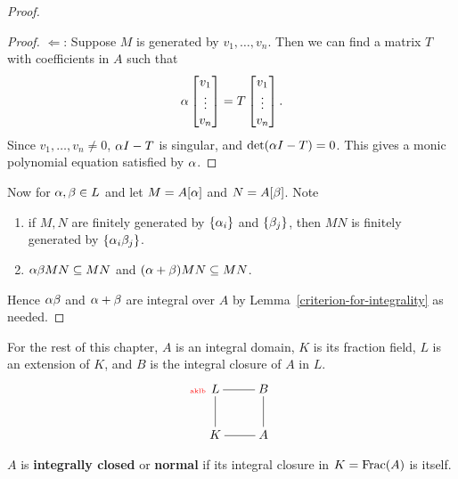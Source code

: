 \begin{proof}
\begin{proof}
$\Leftarrow$: Suppose $M$ is generated by $v_1,\ldots, v_n$. Then we can find a matrix $T$ with coefficients in $A$ such that
\[\alpha \begin{bmatrix}v_1\\ \vdots \\ v_n\end{bmatrix}=
T\begin{bmatrix}v_1\\ \vdots \\ v_n\end{bmatrix}.\]
Since $v_1,\ldots, v_n\neq 0$, $\alpha I-T$ is singular, and $\det(\alpha I-T)=0$. This gives a monic polynomial equation satisfied by $\alpha$.
\end{proof}
Now for $\alpha, \beta\in L$ and let $M=A[\alpha]$ and $N=A[\beta]$. 
Note
\begin{enumerate}
\item
if $M,N$ are finitely generated by $\{\alpha_i\}$ and $\{\beta_j\}$, then
$MN$ is finitely generated by $\{\alpha_i\beta_j\}$.
\item 
$\alpha\beta MN\subseteq MN$ and $(\alpha+\beta)MN\subseteq MN$.
\end{enumerate}
Hence $\alpha\beta$ and $\alpha+\beta$ are integral over $A$ by Lemma~\ref{criterion-for-integrality} as needed.
\end{proof}
For the rest of this chapter, $A$ is an integral domain, $K$ is its fraction field, $L$ is an extension of $K$, and $B$ is the integral closure of $A$ in $L$. %
\begin{equation}\llabel{aklb}
\xymatrix{
L\ar@{-}[r]\ar@{-}[d]&B\ar@{-}[d]\\
K\ar@{-}[r]&A
}
\end{equation}
\begin{df}
$A$ is \textbf{integrally closed} or \textbf{normal} if its integral closure in $K=\operatorname{Frac}(A)$ is itself.
\end{df}

